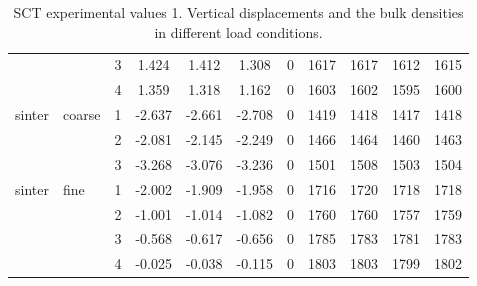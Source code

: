 \begin{table}
\begin{tabular}{ll|c|cccc|cccc}
          &       & 3     & 1.424 & 1.412 & 1.308 & 0     & 1617  & 1617  & 1612  & 1615 \\
          &       & 4     & 1.359 & 1.318 & 1.162 & 0     & 1603  & 1602  & 1595  & 1600 \\
\hline 
    sinter & coarse & 1     & -2.637 & -2.661 & -2.708 & 0     & 1419  & 1418  & 1417  & 1418 \\
          &       & 2     & -2.081 & -2.145 & -2.249 & 0     & 1466  & 1464  & 1460  & 1463 \\
          &       & 3     & -3.268 & -3.076 & -3.236 & 0     & 1501  & 1508  & 1503  & 1504 \\
\hline 
    sinter & fine  & 1     & -2.002 & -1.909 & -1.958 & 0     & 1716  & 1720  & 1718  & 1718 \\
          &       & 2     & -1.001 & -1.014 & -1.082 & 0     & 1760  & 1760  & 1757  & 1759 \\
          &       & 3     & -0.568 & -0.617 & -0.656 & 0     & 1785  & 1783  & 1781  & 1783 \\
          &       & 4     & -0.025 & -0.038 & -0.115 & 0     & 1803  & 1803  & 1799  & 1802 \\
    \hline
\end{tabular}
\caption[SCT experimental values 1]{\acs{SCT} experimental values 1. Vertical
displacements and the bulk densities in different load conditions.}
\label{tab:20shearcell1}
\end{table}
